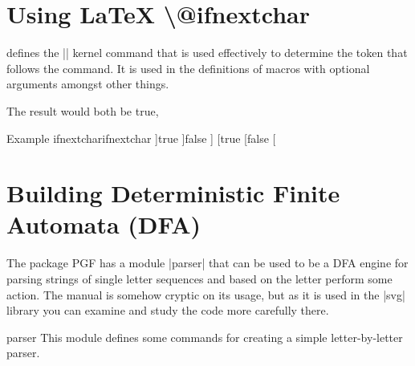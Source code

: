\begin{comment}
\def\elidebefore[#1]#2{[$\ldots$] #2}
\def\elideafter#1{#1$\ldots$}

\def\elide {%
\futurelet\ifoptions
    \choosemacro
}



\def\choosemacro{%
 \ifx\ifoptions [%
     \let\choice = \elidebefore 
 \else
    \let\choice = \elideafter
 \fi
\choice
}

Testing \elide[b]{Lorem ipsum}

\elide{Lorem Ipsum}

\elide[b]{Lorem ipsum}

\end{comment}


\section{Using LaTeX \protect\textbackslash @ifnextchar}

\latex defines the |\@ifnextchar| kernel command that is used effectively to
determine the token that follows the command. It is used in the definitions
of macros with optional arguments amongst other things.

\begin{teXXX}
\@ifnextchar]{true}{false}] 
 ] %
\@ifnextchar[{true [}{false} [ %
\makeatother
\end{texexample}


\section{Building Deterministic Finite Automata (DFA)}
\label{section-module-parser}

The package PGF has a module |parser| that can be used to be a DFA engine for parsing strings of single letter sequences and based on the letter perform some action. The manual is somehow cryptic on its usage, but as it is
used in the |svg| library you can examine and study the code more carefully there.

\begin{pgfmodule}{parser}
  This module defines some commands for creating a simple
  letter-by-letter parser.
\end{pgfmodule}

